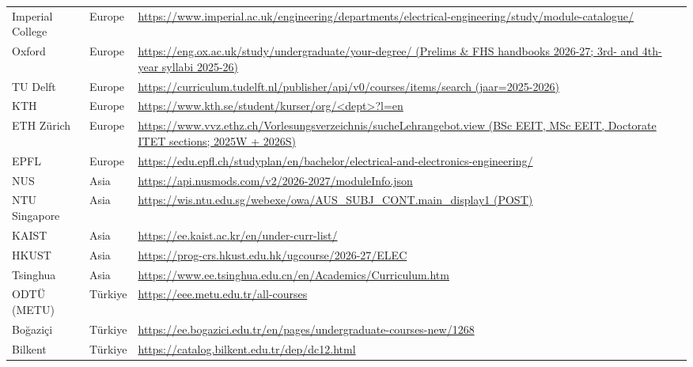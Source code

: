 \documentclass[10pt]{article}
\begin{document}
\begin{longtable}{@{}llL{11.3cm}@{}}
Imperial College & Europe & {\scriptsize\url{https://www.imperial.ac.uk/engineering/departments/electrical-engineering/study/module-catalogue/}} \\
Oxford & Europe & {\scriptsize\url{https://eng.ox.ac.uk/study/undergraduate/your-degree/ (Prelims & FHS handbooks 2026-27; 3rd- and 4th-year syllabi 2025-26)}} \\
TU Delft & Europe & {\scriptsize\url{https://curriculum.tudelft.nl/publisher/api/v0/courses/items/search (jaar=2025-2026)}} \\
KTH & Europe & {\scriptsize\url{https://www.kth.se/student/kurser/org/<dept>?l=en}} \\
ETH Zürich & Europe & {\scriptsize\url{https://www.vvz.ethz.ch/Vorlesungsverzeichnis/sucheLehrangebot.view (BSc EEIT, MSc EEIT, Doctorate ITET sections; 2025W + 2026S)}} \\
EPFL & Europe & {\scriptsize\url{https://edu.epfl.ch/studyplan/en/bachelor/electrical-and-electronics-engineering/}} \\
NUS & Asia & {\scriptsize\url{https://api.nusmods.com/v2/2026-2027/moduleInfo.json}} \\
NTU Singapore & Asia & {\scriptsize\url{https://wis.ntu.edu.sg/webexe/owa/AUS_SUBJ_CONT.main_display1 (POST)}} \\
KAIST & Asia & {\scriptsize\url{https://ee.kaist.ac.kr/en/under-curr-list/}} \\
HKUST & Asia & {\scriptsize\url{https://prog-crs.hkust.edu.hk/ugcourse/2026-27/ELEC}} \\
Tsinghua & Asia & {\scriptsize\url{https://www.ee.tsinghua.edu.cn/en/Academics/Curriculum.htm}} \\
ODTÜ (METU) & Türkiye & {\scriptsize\url{https://eee.metu.edu.tr/all-courses}} \\
Boğaziçi & Türkiye & {\scriptsize\url{https://ee.bogazici.edu.tr/en/pages/undergraduate-courses-new/1268}} \\
Bilkent & Türkiye & {\scriptsize\url{https://catalog.bilkent.edu.tr/dep/dc12.html}} \\
\end{longtable}
\end{document}
